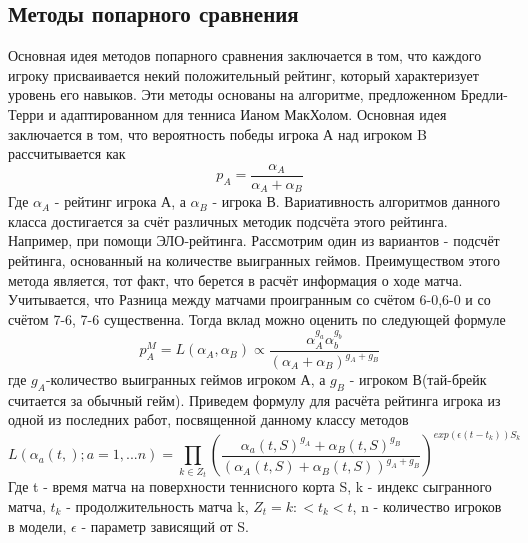 \subsection{Методы попарного сравнения}
Основная идея методов попарного сравнения заключается в том, что каждого игроку присваивается некий положительный рейтинг, который характеризует уровень его навыков. Эти методы основаны на алгоритме, предложенном Бредли-Терри\cite{Book17} и адаптированном для тенниса Ианом МакХолом\cite{Book18}.
Основная идея заключается в том, что вероятность победы игрока А над игроком B рассчитывается как
\begin{equation}
p_A=\frac{\alpha_A}{\alpha_A + \alpha_B}\label{eq2}
\end{equation}
Где $\alpha_A$ - рейтинг игрока А, а $\alpha_B$ - игрока В. Вариативность алгоритмов данного класса достигается за счёт различных методик подсчёта этого рейтинга. Например, при помощи ЭЛО-рейтинга\cite{Book24}. Рассмотрим один из вариантов - подсчёт рейтинга, основанный на количестве выигранных геймов. Преимуществом этого метода является, тот факт, что берется в расчёт информация о ходе матча. Учитывается, что Разница между матчами проигранным со счётом 6-0,6-0 и со счётом 7-6, 7-6 существенна.
Тогда вклад можно оценить по следующей формуле
\begin{equation}
p^M_A=L(\alpha_A,\alpha_B) ∝\frac{\alpha_A^{g_a}\alpha_b^{g_b}}{(\alpha_A + \alpha_B)^{g_A + g_B}}
\end{equation} 
где $g_A$-количество выигранных геймов игроком А, а $g_B$ -  игроком В(тай-брейк  считается за обычный гейм).
Приведем формулу для расчёта рейтинга игрока из одной из последних работ, посвященной данному классу методов
\begin{equation}
L(\alpha_a(t,); a=1,...n) = \prod_{k\in Z_t}(\frac{\alpha_a(t,S)^{g_A} + \alpha_B(t,S)^{g_B}}{(\alpha_A(t,S) + \alpha_B(t,S))^{g_A + g_B}})^{exp(\epsilon( t-t_k))S_k}
\end{equation}
Где t - время матча на поверхности теннисного корта S, k - индекс сыгранного матча, $t_k$ - продолжительность матча k, $Z_t={k : < t_k < t}$, n - количество игроков в модели, $\epsilon$ - параметр зависящий от S.

